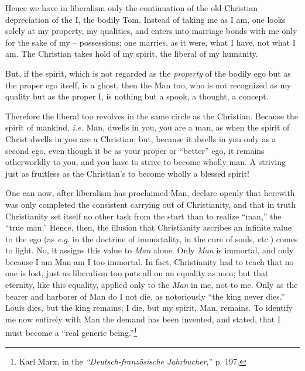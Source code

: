 Hence we have in liberalism only the continuation of the old Christian 
depreciation of the I, the bodily Tom. Instead of taking me as I am, one looks 
solely at my property, my qualities, and enters into marriage bonds with me 
only for the sake of my -- possessions; one marries, as it were, what I have, 
not what I am. The Christian takes hold of my spirit, the liberal of my 
humanity.

But, if the spirit, which is not regarded as the \textit{property} of the 
bodily ego but as the proper ego itself, is a ghost, then the Man too, who is 
not recognized as my quality but as the proper I, is nothing but a spook, a 
thought, a concept.

Therefore the liberal too revolves in the same circle as the Christian. 
Because the spirit of mankind, \textit{i.e.} Man, dwells in you, you are a 
man, as when the spirit of Christ dwells in you are a Christian; but, because 
it dwells in you only as a second ego, even though it be as your proper or 
``better'' ego, it remains otherworldly to you, and you have to strive to 
become wholly man. A striving just as fruitless as the Christian's to become 
wholly a blessed spirit!

One can now, after liberalism has proclaimed Man, declare openly that herewith 
was only completed the consistent carrying out of Christianity, and that in 
truth Christianity set itself no other task from the start than to realize 
``man,'' the ``true man.'' Hence, then, the illusion that Christianity 
ascribes an infinite value to the ego (as \textit{e.g.} in the doctrine of 
immortality, in the cure of souls, etc.) comes to light. No, it assigns this 
value to \textit{Man} alone. Only \textit{Man} is immortal, and only because I 
am Man am I too immortal. In fact, Christianity had to teach that no one is 
lost, just as liberalism too puts all on an equality as men; but that 
eternity, like this equality, applied only to the \textit{Man} in me, not to 
me. Only as the bearer and harborer of Man do I not die, as notoriously ``the 
king never dies.'' Louis dies, but the king remains; I die, but my spirit, 
Man, remains. To identify me now entirely with Man the demand has been 
invented, and stated, that I must become a ``real generic 
being.''\footnote{Karl Marx, in the \textit{``Deutsch-franz\"osische 
Jahrbucher},'' p. 197.}

